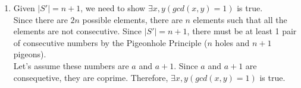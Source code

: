 \documentclass[a4paper]{article}
\begin{document}
\begin{enumerate}
\begin{enumerate}
        \item Given $|S'| = n + 1$, we need to show $\exists x,y (gcd(x,y) = 1)$ is true. \\

        Since there are $2n$ possible elements, there are $n$ elements such that all the elements are not consecutive. Since $|S'| = n + 1$, there must be at least 1 pair of consecutive numbers by the Pigeonhole Principle ($n$ holes and $n+1$ pigeons). \\
        
        Let's assume these numbers are $a$ and $a+1$. Since $a$ and $a+1$ are consequetive, they are coprime. Therefore, $\exists x,y (gcd(x,y) = 1)$ is true. \\

    \end{enumerate}
    \end{enumerate}


\newpage
\end{document}

